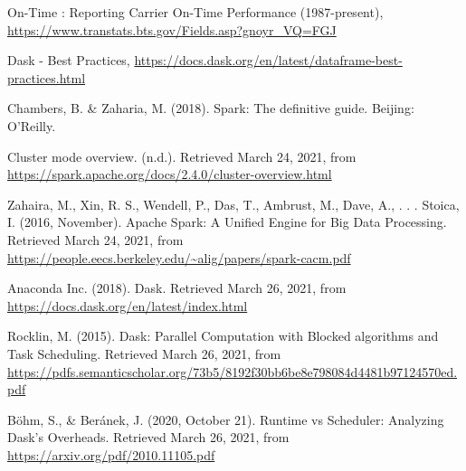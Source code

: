 \documentclass[11pt, oneside]{book}
\begin{document}
\begin{thebibliography}{111}







 On-Time : Reporting Carrier On-Time Performance (1987-present), \url{https://www.transtats.bts.gov/Fields.asp?gnoyr_VQ=FGJ}

 Dask - Best Practices, \url{https://docs.dask.org/en/latest/dataframe-best-practices.html}

 Chambers, B. \& Zaharia, M. (2018). Spark: The definitive guide. Beijing: O'Reilly.

 Cluster mode overview. (n.d.). Retrieved March 24, 2021, from \url{https://spark.apache.org/docs/2.4.0/cluster-overview.html}

 Zahaira, M., Xin, R. S., Wendell, P., Das, T., Ambrust, M., Dave, A., . . . Stoica, I. (2016, November). Apache Spark: A Unified Engine for Big Data Processing. Retrieved March 24, 2021, from \url{https://people.eecs.berkeley.edu/~alig/papers/spark-cacm.pdf}

 Anaconda Inc. (2018). Dask. Retrieved March 26, 2021, from \url{https://docs.dask.org/en/latest/index.html}

 Rocklin, M. (2015). Dask: Parallel Computation with Blocked algorithms and Task Scheduling. Retrieved March 26, 2021, from \url{https://pdfs.semanticscholar.org/73b5/8192f30bb6be8e798084d4481b97124570ed.pdf}

 Böhm, S., \& Beránek, J. (2020, October 21). Runtime vs Scheduler: Analyzing Dask’s Overheads. Retrieved March 26, 2021, from \url{https://arxiv.org/pdf/2010.11105.pdf}


\end{thebibliography}
\end{document}
